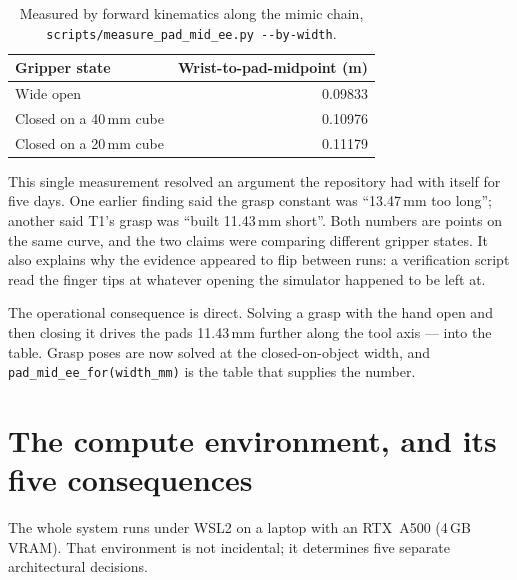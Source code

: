 \documentclass[11pt,a4paper,oneside]{report}
\newcommand{\code}[1]{\texttt{\small #1}}
\newcommand{\file}[1]{\texttt{\small #1}}
\begin{document}
\begin{table}[H]
\centering
\small
\begin{tabular}{@{}lr@{}}
\toprule
\textbf{Gripper state} & \textbf{Wrist-to-pad-midpoint (m)} \\
\midrule
Wide open & 0.09833 \\
Closed on a 40\,mm cube & 0.10976 \\
Closed on a 20\,mm cube & 0.11179 \\
\bottomrule
\end{tabular}
\caption{Measured by forward kinematics along the mimic chain,
\file{scripts/measure\_pad\_mid\_ee.py -{}-by-width}.}
\end{table}

This single measurement resolved an argument the repository had with itself for
five days. One earlier finding said the grasp constant was ``13.47\,mm too
long''; another said T1's grasp was ``built 11.43\,mm short''. Both numbers are
points on the same curve, and the two claims were comparing different gripper
states. It also explains why the evidence appeared to flip between runs: a
verification script read the finger tips at whatever opening the simulator
happened to be left at.

The operational consequence is direct. Solving a grasp with the hand open and
then closing it drives the pads 11.43\,mm further along the tool axis --- into
the table. Grasp poses are now solved at the closed-on-object width, and
\code{pad\_mid\_ee\_for(width\_mm)} is the table that supplies the number.

\section{The compute environment, and its five consequences}

The whole system runs under WSL2 on a laptop with an RTX~A500 (4\,GB VRAM).
That environment is not incidental; it determines five separate architectural
decisions.
\end{document}
